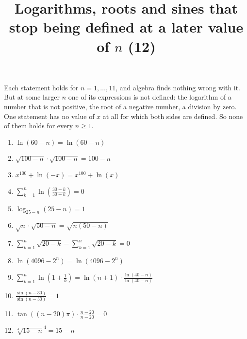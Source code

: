 \documentclass[11pt,a4paper]{article}
\title{Logarithms, roots and sines that stop being defined at a later value of $n$ (12)}
\author{}
\date{}
\begin{document}
\maketitle
Each statement holds for $n = 1, \ldots, 11$, and algebra finds nothing wrong with it. But at some larger $n$ one of its expressions is not defined: the logarithm of a number that is not positive, the root of a negative number, a division by zero. One statement has no value of $x$ at all for which both sides are defined. So none of them holds for every $n \ge 1$.

\begin{enumerate}
\item $\displaystyle \ln\left(60 - n\right) = \ln\left(60 - n\right)$
\item $\displaystyle \sqrt{100 - n} \cdot \sqrt{100 - n} = 100 - n$
\item $\displaystyle x^{100} + \ln\left(-x\right) = x^{100} + \ln\left(x\right)$
\item $\displaystyle \sum_{k=1}^{n} \ln\left(\frac{30 - k}{30 - k}\right) = 0$
\item $\displaystyle \log_{25 - n}\left(25 - n\right) = 1$
\item $\displaystyle \sqrt{n} \cdot \sqrt{50 - n} = \sqrt{n\left(50 - n\right)}$
\item $\displaystyle \sum_{k=1}^{n} \sqrt{20 - k} - \sum_{k=1}^{n} \sqrt{20 - k} = 0$
\item $\displaystyle \ln\left(4096 - 2^{n}\right) = \ln\left(4096 - 2^{n}\right)$
\item $\displaystyle \sum_{k=1}^{n} \ln\left(1 + \frac{1}{k}\right) = \ln\left(n + 1\right) \cdot \frac{\ln\left(40 - n\right)}{\ln\left(40 - n\right)}$
\item $\displaystyle \frac{\sin\left(n - 30\right)}{\sin\left(n - 30\right)} = 1$
\item $\displaystyle \tan\left(\left(n - 20\right) \pi\right) \cdot \frac{n - 20}{n - 20} = 0$
\item $\displaystyle \sqrt[4]{15 - n}^{4} = 15 - n$
\end{enumerate}
\end{document}
